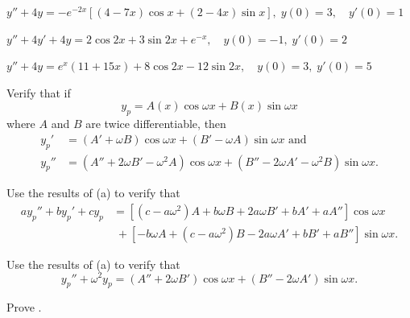 \begin{exerciselist}
\item\label{exer:5.5.33}\CGex
$y''+4y=-e^{-2x}\left[(4-7x)\cos x+(2-4x)\sin x\right],
\;  y(0)=3, \quad   y'(0)=1$

\item\label{exer:5.5.34}\CGex
$y''+4y'+4y=2\cos2x+3\sin2x+e^{-x} , \quad   y(0)=-1,\;  y'(0)=2$

\item\label{exer:5.5.35}\CGex
$y''+4y=e^x(11+15x)+8\cos2x-12\sin2x , \quad   y(0)=3,\;  y'(0)=5$

\item\label{exer:5.5.36}\begin{alist}
\item %
Verify that if
\[
y_p=A(x)\cos\omega x+B(x)\sin\omega x
\]
where $A$ and $B$ are twice differentiable, then
\begin{align*}
 y_p'&=(A'+\omega B)\cos\omega x+(B'-\omega A)\sin\omega x\text{ and}\\
 y_p''&=(A''+2\omega B'-\omega^2A)\cos\omega x
+(B''-2\omega A'-\omega^2B)\sin\omega x.
\end{align*}
\item %
Use the results of (a)  to verify that
\begin{align*}
ay_p''+by_p'+cy_p&=\left[(c-a\omega^2)A+b\omega B+2a\omega
B'+bA'+aA''\right] \cos\omega x\\
&\;+\left[-b\omega A+(c-a\omega^2)B-2a\omega A'+bB'+aB''\right]\sin\omega x.
\end{align*}
\item %
Use the results of (a)  to verify that
\[
y_p''+\omega^2 y_p=(A''+2\omega B')\cos\omega x+
(B''-2\omega A')\sin\omega x.
\]
\item %
Prove .
\end{alist}


\end{exerciselist}
